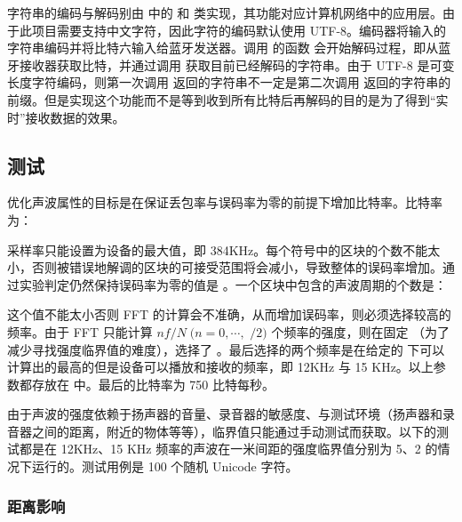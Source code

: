 字符串的编码与解码别由  中的  和  类实现，其功能对应计算机网络中的应用层。由于此项目需要支持中文字符，因此字符的编码默认使用 UTF-8。编码器将输入的字符串编码并将比特六输入给蓝牙发送器。调用  的函数  会开始解码过程，即从蓝牙接收器获取比特，并通过调用  获取目前已经解码的字符串。由于 UTF-8 是可变长度字符编码，则第一次调用  返回的字符串不一定是第二次调用  返回的字符串的前缀。但是实现这个功能而不是等到收到所有比特后再解码的目的是为了得到“实时”接收数据的效果。

\subsection{测试}

优化声波属性的目标是在保证丢包率与误码率为零的前提下增加比特率。比特率为：

\noindent{}

采样率只能设置为设备的最大值，即 384KHz。每个符号中的区块的个数不能太小，否则被错误地解调的区块的可接受范围将会减小，导致整体的误码率增加。通过实验判定仍然保持误码率为零的值是 。一个区块中包含的声波周期的个数是：

\noindent{}

这个值不能太小否则 FFT 的计算会不准确，从而增加误码率，则必须选择较高的频率。由于 FFT 只能计算 $nf/N\;(n=0,\cdots,$  $/2)$ 个频率的强度，则在固定 （为了减少寻找强度临界值的难度），选择了 。最后选择的两个频率是在给定的  下可以计算出的最高的但是设备可以播放和接收的频率，即 12KHz 与 15 KHz。以上参数都存放在  中。最后的比特率为 750 比特每秒。

\newpage

由于声波的强度依赖于扬声器的音量、录音器的敏感度、与测试环境（扬声器和录音器之间的距离，附近的物体等等），临界值只能通过手动测试而获取。以下的测试都是在 12KHz、15 KHz 频率的声波在一米间距的强度临界值分别为 5、2 的情况下运行的。测试用例是 100 个随机 Unicode 字符。 

\subsubsection{距离影响}

